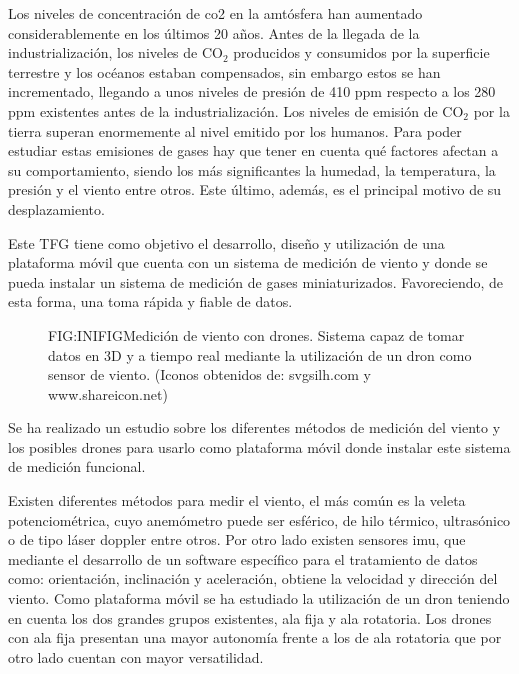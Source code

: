 

Los niveles de concentración de \ac{co2} en la amtósfera han aumentado considerablemente en los últimos 20 años. Antes de la llegada de la industrialización, los niveles de CO$_2$ producidos y consumidos por la superficie terrestre y los océanos estaban compensados, sin embargo estos se han incrementado, llegando a unos niveles de presión de 410 \ac{ppm} respecto a los 280 ppm existentes antes de la industrialización\cite{Hansen1998}\cite{co2atmo}. Los niveles de emisión de CO$_2$ por la tierra superan enormemente al nivel emitido por los humanos. Para poder estudiar estas emisiones de gases hay que tener en cuenta qué factores afectan a su comportamiento, siendo los más significantes la humedad, la temperatura, la presión y el viento entre otros. Este último, además, es el principal motivo de su desplazamiento.

Este TFG tiene como objetivo el desarrollo, diseño y utilización de una plataforma móvil que cuenta con un sistema de medición de viento y donde se pueda instalar un sistema de medición de gases miniaturizados. Favoreciendo, de esta forma, una toma rápida y fiable de datos. 

\begin{figure}[Medición de viento con drones]{FIG:INIFIG}{Medición de viento con drones. Sistema capaz de tomar datos en 3D y a tiempo real mediante la utilización de un dron como sensor de viento. (Iconos obtenidos de: svgsilh.com y www.shareicon.net)}
\end{figure}

Se ha realizado un estudio  sobre los diferentes métodos de medición del viento y los posibles drones para usarlo como plataforma móvil donde instalar este sistema de medición funcional.

Existen diferentes métodos para medir el viento, el más común es la veleta potenciométrica, cuyo anemómetro puede ser esférico, de hilo térmico, ultrasónico o de tipo láser doppler entre otros. Por otro lado existen sensores \ac{imu}, que mediante el desarrollo de un software específico para el tratamiento de datos como: orientación, inclinación y aceleración, obtiene la velocidad y dirección del viento. Como plataforma móvil se ha estudiado la utilización de un dron teniendo en cuenta los dos grandes grupos existentes, ala fija y ala rotatoria. Los drones con ala fija presentan una mayor autonomía frente a los de ala rotatoria que por otro lado cuentan con mayor versatilidad.

